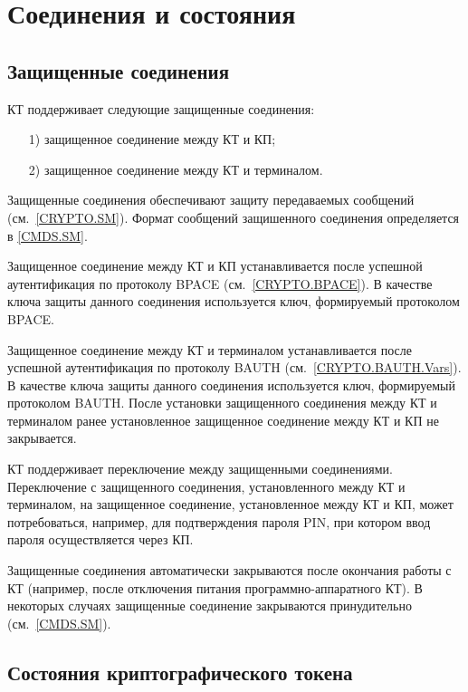 \chapter{Соединения и состояния}
\label{STATES}

\section{Защищенные соединения}
\label{STATES.SM}

КТ поддерживает следующие защищенные соединения:
%
\begin{itemize}
\item[1)]
защищенное соединение между КТ и КП;
\item[2)]
защищенное соединение между КТ и терминалом.
\end{itemize}
%
Защищенные соединения обеспечивают защиту передаваемых сообщений
(см.~\ref{CRYPTO.SM}). Формат сообщений защишенного
соединения определяется в \ref{CMDS.SM}.

Защищенное соединение между КТ и КП устанавливается 
после успешной аутентификация по протоколу BPACE (см.~\ref{CRYPTO.BPACE}).
В качестве ключа защиты данного соединения используется 
ключ, формируемый протоколом BPACE.

Защищенное соединение между КТ и терминалом устанавливается 
после успешной аутентификация по протоколу BAUTH (см.~\ref{CRYPTO.BAUTH.Vars}).
В качестве ключа защиты данного соединения используется 
ключ, формируемый протоколом BAUTH.
После установки защищенного соединения между КТ и терминалом
ранее установленное защищенное соединение между КТ и КП
не закрывается. 

КТ поддерживает переключение между защищенными соединениями.
Переключение с защищенного соединения, установленного 
между КТ и терминалом, на защищенное соединение,
установленное между КТ и КП, 
может потребоваться, например,
для подтверждения пароля PIN, при котором ввод 
пароля осуществляется через КП. 

Защищенные соединения автоматически закрываются 
после окончания работы с КТ 
(например, после отключения питания программно-аппаратного КТ).
В некоторых случаях защищенные соединение закрываются
принудительно (см.~\ref{CMDS.SM}).

\section{Состояния криптографического токена}
\label{STATES.ST}

